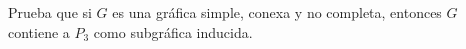Prueba que si $G$ es una gráfica simple, conexa y no completa, entonces
$G$ contiene a $P_3$ como subgráfica inducida.